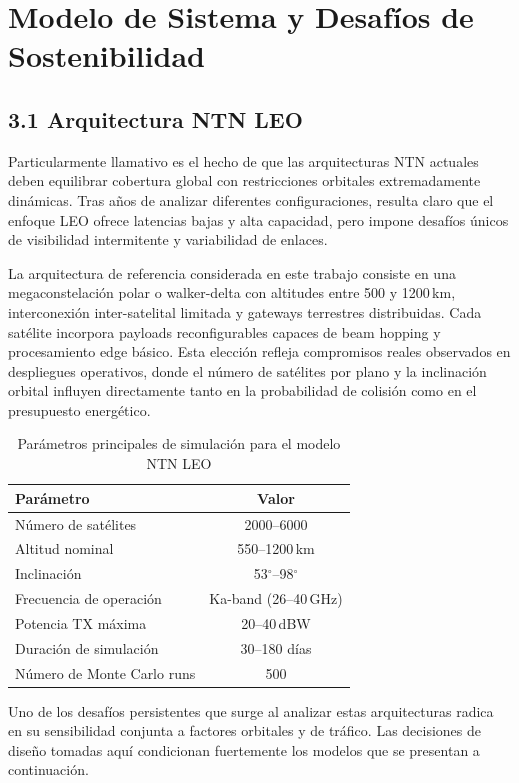 \section{Modelo de Sistema y Desafíos de Sostenibilidad}

\subsection{3.1 Arquitectura NTN LEO}

Particularmente llamativo es el hecho de que las arquitecturas NTN actuales deben equilibrar cobertura global con restricciones orbitales extremadamente dinámicas. Tras años de analizar diferentes configuraciones, resulta claro que el enfoque LEO ofrece latencias bajas y alta capacidad, pero impone desafíos únicos de visibilidad intermitente y variabilidad de enlaces.

La arquitectura de referencia considerada en este trabajo consiste en una megaconstelación polar o walker-delta con altitudes entre 500 y 1200\,km, interconexión inter-satelital limitada y gateways terrestres distribuidas. Cada satélite incorpora payloads reconfigurables capaces de beam hopping y procesamiento edge básico. Esta elección refleja compromisos reales observados en despliegues operativos, donde el número de satélites por plano y la inclinación orbital influyen directamente tanto en la probabilidad de colisión como en el presupuesto energético.

\begin{table}[t]
\centering
\caption{Parámetros principales de simulación para el modelo NTN LEO}
\label{tab:parametros_simulacion}
\begin{tabular}{lc}
\hline
Parámetro & Valor \\
\hline
Número de satélites & 2000--6000 \\
Altitud nominal & 550--1200\,km \\
Inclinación & 53$^\circ$--98$^\circ$ \\
Frecuencia de operación & Ka-band (26--40\,GHz) \\
Potencia TX máxima & 20--40\,dBW \\
Duración de simulación & 30--180 días \\
Número de Monte Carlo runs & 500 \\
\hline
\end{tabular}
\end{table}

Uno de los desafíos persistentes que surge al analizar estas arquitecturas radica en su sensibilidad conjunta a factores orbitales y de tráfico. Las decisiones de diseño tomadas aquí condicionan fuertemente los modelos que se presentan a continuación.

